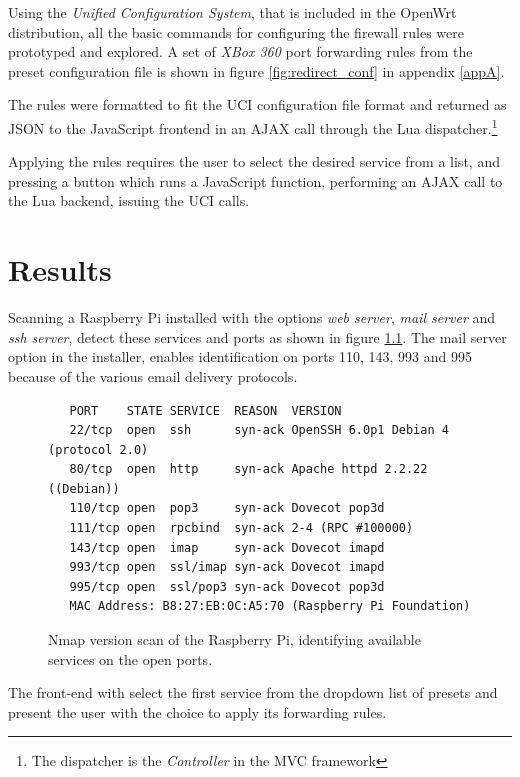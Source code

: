\documentclass[a4paper,11pt]{kth-bcs}
\begin{document}
Using the \emph{Unified Configuration System}, that is included in the OpenWrt distribution, all the basic commands for configuring the firewall rules were prototyped and explored.
A set of \emph{XBox 360} port forwarding rules from the preset configuration file is shown in figure \ref{fig:redirect_conf} in appendix \ref{appA}.

The rules were formatted to fit the UCI configuration file format and returned as JSON to the JavaScript frontend in an AJAX call through the Lua dispatcher.\footnote{The dispatcher is the \emph{Controller} in the MVC framework}

Applying the rules requires the user to select the desired service from a list, and pressing a button which runs a JavaScript function, performing an AJAX call to the Lua backend, issuing the UCI calls.


\chapter{Results}

Scanning a Raspberry Pi installed with the options \emph{web server}, \emph{mail server} and \emph{ssh server}, detect these services and ports as shown in figure \ref{fig:rasp_scan}.
The mail server option in the installer, enables identification on ports 110, 143, 993 and 995 because of the various email delivery protocols.

   \begin{figure}[ht]
      \centering
      \label{fig:rasp_scan}
\begin{verbatim}
   PORT    STATE SERVICE  REASON  VERSION
   22/tcp  open  ssh      syn-ack OpenSSH 6.0p1 Debian 4 (protocol 2.0)
   80/tcp  open  http     syn-ack Apache httpd 2.2.22 ((Debian))
   110/tcp open  pop3     syn-ack Dovecot pop3d
   111/tcp open  rpcbind  syn-ack 2-4 (RPC #100000)
   143/tcp open  imap     syn-ack Dovecot imapd
   993/tcp open  ssl/imap syn-ack Dovecot imapd
   995/tcp open  ssl/pop3 syn-ack Dovecot pop3d
   MAC Address: B8:27:EB:0C:A5:70 (Raspberry Pi Foundation)
\end{verbatim}
      \caption{
         \small{
Nmap version scan of the Raspberry Pi, identifying available services on the open ports.
         }
      }
   \end{figure}
The front-end with select the first service from the dropdown list of presets and present the user with the choice to apply its forwarding rules.
\end{document}
